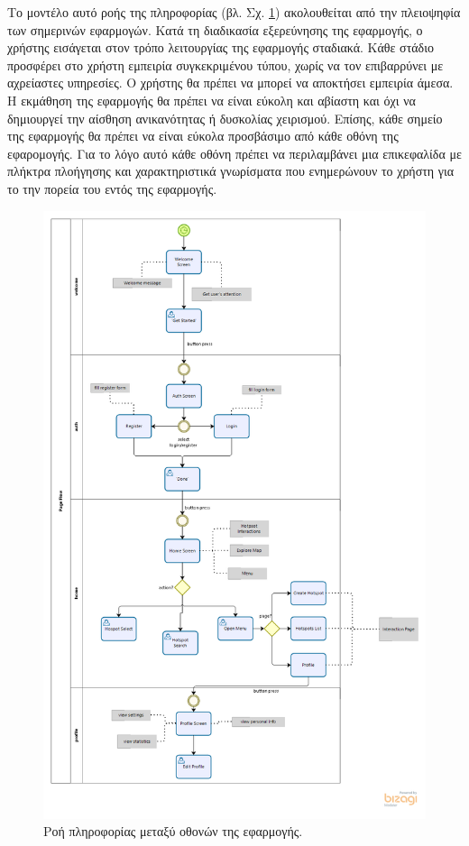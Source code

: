 Το μοντέλο αυτό ροής της πληροφορίας (βλ. Σχ. \ref{pageflow}) ακολουθείται από την πλειοψηφία των σημερινών εφαρμογών. Κατά τη διαδικασία εξερεύνησης της εφαρμογής, ο χρήστης εισάγεται στον τρόπο λειτουργίας της εφαρμογής σταδιακά. Κάθε στάδιο προσφέρει στο χρήστη εμπειρία συγκεκριμένου τύπου, χωρίς να τον επιβαρρύνει με αχρείαστες υπηρεσίες. Ο χρήστης θα πρέπει να μπορεί να αποκτήσει εμπειρία άμεσα. Η εκμάθηση της εφαρμογής θα πρέπει να είναι εύκολη και αβίαστη και όχι να δημιουργεί την αίσθηση ανικανότητας ή δυσκολίας χειρισμού. \newline
\indent
Επίσης, κάθε σημείο της εφαρμογής θα πρέπει να είναι εύκολα προσβάσιμο από κάθε οθόνη της εφαρομογής. Για το λόγο αυτό κάθε οθόνη πρέπει να περιλαμβάνει μια επικεφαλίδα με πλήκτρα πλοήγησης και χαρακτηριστικά γνωρίσματα που ενημερώνουν το χρήστη για το την πορεία του εντός της εφαρμογής.


\begin{figure}[H]
    \centering
    \includegraphics[scale=0.5]{figures/page-flow.png}
    \caption{Ροή πληροφορίας μεταξύ οθονών της εφαρμογής.}
    \label{pageflow}
\end{figure}


